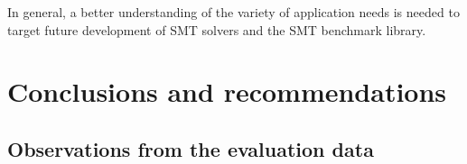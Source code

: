 \documentclass[smallcondensed]{svjour3}
\begin{document}
In general, a better understanding of the variety of application needs is needed to target future development of SMT solvers and the SMT benchmark library.

%
%
%

\section{Conclusions and recommendations}
\label{Conclusions}

\subsection{Observations from the evaluation data}
\end{document}

